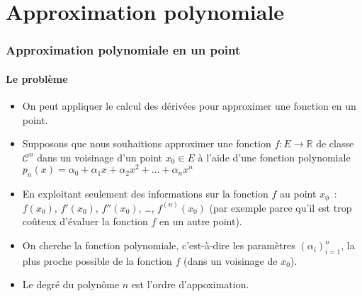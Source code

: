 \documentclass[10pt,notheorems]{beamer}
\theoremstyle{plain}
\theoremstyle{definition} %
\begin{document}
\section{Approximation polynomiale}

\begin{frame}
  \frametitle{Approximation polynomiale en un point}
  \framesubtitle{Le problème}
  \hypertarget{slide_taylor_1}{}

  \begin{itemize}

  \item On peut appliquer le calcul des dérivées pour approximer une fonction en un point.\newline

  \item Supposons que nous souhaitions approximer une fonction $f: E\rightarrow \mathbb R$ de classe $\mathcal C^n$ dans un voisinage d'un point $x_0\in E$ à l'aide d'une fonction polynomiale $p_n(x) = \alpha_0+\alpha_1x+\alpha_2x^2+\ldots+\alpha_nx^n$\newline

  \item En exploitant seulement des informations sur la fonction $f$ au point $x_0$~: $f(x_0)$, $f'(x_0)$, $f''(x_0)$, \ldots, $f^{(n)}(x_0)$ (par exemple parce qu'il est trop coûteux d'évaluer la fonction $f$ en un autre point).\newline

  \item On cherche la fonction polynomiale, c'est-à-dire les paramètres $(\alpha_i)_{i=1}^n$, la plus proche possible de la fonction $f$ (dans un voisinage de $x_0$).\newline

  \item Le degré du polynôme $n$ est l'ordre d'appoximation.

  \end{itemize}

\end{frame}
\end{document}
